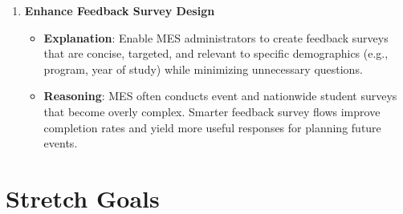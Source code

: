 \documentclass{article}
\begin{document}
\begin{enumerate}
    \item \textbf{Enhance Feedback Survey Design}
    \begin{itemize}
        \item \textbf{Explanation}: Enable MES administrators to create feedback surveys that are concise, targeted, and relevant to specific demographics (e.g., program, year of study) while minimizing unnecessary questions.
        \item \textbf{Reasoning}: MES often conducts event and nationwide student surveys that become overly complex. Smarter feedback survey flows improve completion rates and yield more useful responses for planning future events.
    \end{itemize}

\end{enumerate}

\section{Stretch Goals}
\end{document}
